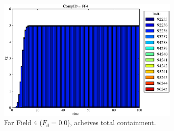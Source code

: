 \begin{frame}
\begin{figure}
\begin{minipage}[b]{0.45\linewidth}
  \includegraphics[width=0.8\textwidth]{./images/drIV0.eps}
  \caption[Case DRIV Waste Package Contaminants.]{ 
    Far Field 4 ($F_d = 0.0$), acheives total containment.
    }
  \label{fig:drIVff0}


  \end{minipage}
\end{figure}
\end{frame}
